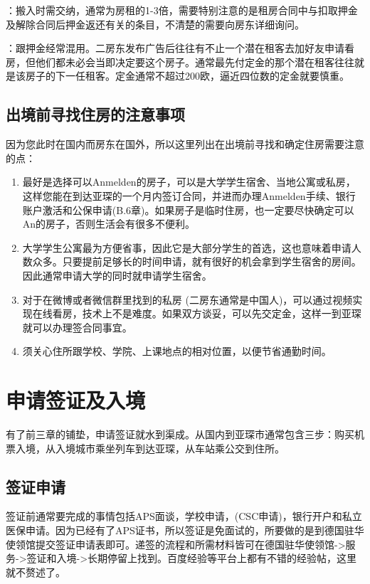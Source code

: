     ：搬入时需交纳，通常为房租的1-3倍，需要特别注意的是租房合同中与扣取押金及解除合同后押金返还有关的条目，不清楚的需要向房东详细询问。

    ：跟押金经常混用。二房东发布广告后往往有不止一个潜在租客去加好友申请看房，但他们都未必会当即决定要这个房子。通常最先付定金的那个潜在租客往往就是该房子的下一任租客。定金通常不超过200欧，逼近四位数的定金就要慎重。

  \subsection{出境前寻找住房的注意事项}\label{subsec:出境前寻找住房的注意事项}

    因为您此时在国内而房东在国外，所以这里列出在出境前寻找和确定住房需要注意的点：

    \begin{enumerate}
      \item 最好是选择可以Anmelden的房子，可以是大学学生宿舍、当地公寓或私房，这样您能在到达亚琛的一个月内签订合同，并进而办理Anmelden手续、银行账户激活和公保申请(B.6章)。如果房子是临时住房，也一定要尽快确定可以An的房子，否则生活会有很多不便利。
      \item 大学学生公寓最为方便省事，因此它是大部分学生的首选，这也意味着申请人数众多。只要提前足够长的时间申请，就有很好的机会拿到学生宿舍的房间。因此通常申请大学的同时就申请学生宿舍。
      \item 对于在微博或者微信群里找到的私房 (二房东通常是中国人)，可以通过视频实现在线看房，技术上不是难度。如果双方谈妥，可以先交定金，这样一到亚琛就可以办理签合同事宜。
      \item 须关心住所跟学校、学院、上课地点的相对位置，以便节省通勤时间。
    \end{enumerate}


\section{申请签证及入境}\label{sec:申请签证及入境}

  有了前三章的铺垫，申请签证就水到渠成。从国内到亚琛市通常包含三步：购买机票入境，从入境城市乘坐列车到达亚琛，从车站乘公交到住所。

  \subsection{签证申请}\label{subsec:签证申请}

    签证前通常要完成的事情包括APS面谈，学校申请，(CSC申请)，银行开户和私立医保申请。因为已经有了APS证书，所以签证是免面试的，所要做的是到德国驻华使领馆提交签证申请表即可。递签的流程和所需材料皆可在德国驻华使领馆->服务->签证和入境->长期停留上找到。百度经验等平台上都有不错的经验帖，这里就不赘述了。

